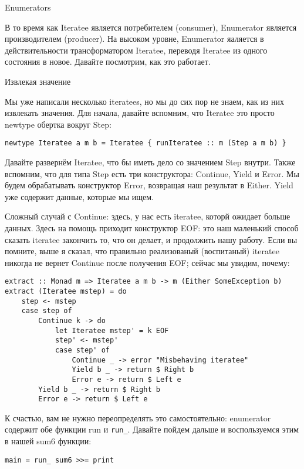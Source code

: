 Enumerators

В то время как Iteratee является потребителем (consumer), Enumerator является производителем (producer). На высоком уровне, Enumerator яаляется в действительности трансформатором Iteratee, переводя Iteratee из одного состояния в новое. Давайте посмотрим, как это работает.

Извлекая значение

Мы уже написали несколько iteratees, но мы до сих пор не знаем, как из них извлекать значения. Для начала, давайте вспомним, что Iteratee это просто newtype обертка вокруг Step:

\begin{lstlisting}
newtype Iteratee a m b = Iteratee { runIteratee :: m (Step a m b) }
\end{lstlisting}

Давайте развернём Iteratee, что бы иметь дело со значением Step внутри. Также вспомним, что для типа Step есть три конструктора: Continue, Yield и Error. Мы будем обрабатывать конструктор Error, возвращая наш результат в Either. Yield уже содержит данные, которые мы ищем.

Сложный случай с Continue: здесь, у нас есть iteratee, которй  ожидает больше данных. Здесь на помощь приходит конструктор EOF: это наш маленький способ сказать iteratee закончить то, что он делает, и продолжить нашу работу. Если вы помните, выше я сказал, что правильно реализованый (воспитаный) iteratee никогда не вернет Continue после получения EOF; сейчас мы увидим, почему:

\begin{lstlisting}
extract :: Monad m => Iteratee a m b -> m (Either SomeException b)
extract (Iteratee mstep) = do
    step <- mstep
    case step of
        Continue k -> do
            let Iteratee mstep' = k EOF
            step' <- mstep'
            case step' of
                Continue _ -> error "Misbehaving iteratee"
                Yield b _ -> return $ Right b
                Error e -> return $ Left e
        Yield b _ -> return $ Right b
        Error e -> return $ Left e
\end{lstlisting}

К счастью, вам не нужно переопределять это самостоятельно: enumerator содержит обе функции run и \lstinline!run_!. Давайте пойдем дальше и воспользуемся этим в нашей sum6 функции:

\begin{lstlisting}
main = run_ sum6 >>= print
\end{lstlisting}

